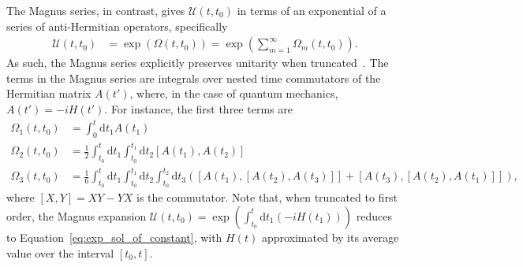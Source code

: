 \documentclass{jors}
\begin{document}
		The Magnus series, in contrast, gives $ \mathcal{U}(t, t_0) $ in terms of an exponential of a series of anti-Hermitian operators, specifically
		\begin{align}
			\mathcal{U}(t, t_0) &= \exp\left(\Omega(t, t_0)\right) = \exp\left(\sum_{m = 1}^\infty \Omega_m(t, t_0)\right).
		\end{align}
		As such, the Magnus series explicitly preserves unitarity when truncated~\cite{magnus_exponential_1954}.
		The terms in the Magnus series are integrals over nested time commutators of the Hermitian matrix $ A(t') $, where, in the case of quantum mechanics, $ A(t') = -iH(t') $.
		For instance, the first three terms are~\cite{blanes_magnus_2009}
		\begin{align}
			\Omega_1(t, t_0) &= \int_0^t\mathrm{d}t_1A(t_1)\\
			\Omega_2(t, t_0) &= \frac12\int_{t_0}^t\mathrm{d}t_1\int_{t_0}^{t_1}\mathrm{d}t_2[A(t_1), A(t_2)]\\
			\Omega_3(t, t_0) &= \frac16\int_{t_0}^t\mathrm{d}t_1\int_{t_0}^{t_1}\mathrm{d}t_2\int_{t_0}^{t_2}\mathrm{d}t_3\left([A(t_1), [A(t_2), A(t_3)]] + [A(t_3), [A(t_2), A(t_1)]]\right),
		\end{align}
		where $ [X, Y] = XY - YX $ is the commutator.
		Note that, when truncated to first order, the Magnus expansion $ \mathcal{U}(t, t_0) = \exp\left(\int_{t_0}^t\mathrm{d}t_1\left(-iH(t_1)\right)\right) $ reduces to Equation~\eqref{eq:exp_sol_of_constant}, with $ H(t) $ approximated by its average value over the interval $ [t_0, t] $.

\end{document}
